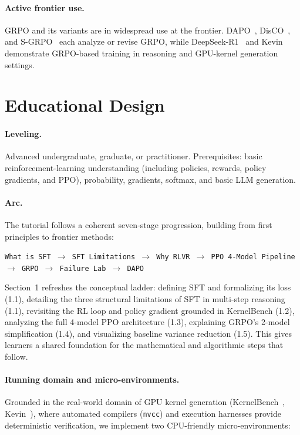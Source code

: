 \documentclass{article}
\begin{document}
\paragraph{Active frontier use.} GRPO and its variants are in widespread use at the frontier. DAPO~\cite{dapo}, DisCO~\cite{disco}, and S-GRPO~\cite{sgrpo} each analyze or revise GRPO, while DeepSeek-R1~\cite{deepseekr1} and Kevin~\cite{kevin} demonstrate GRPO-based training in reasoning and GPU-kernel generation settings.

\section{Educational Design}

\paragraph{Leveling.} Advanced undergraduate, graduate, or practitioner. Prerequisites: basic reinforcement-learning understanding (including policies, rewards, policy gradients, and PPO), probability, gradients, softmax, and basic LLM generation.

\paragraph{Arc.} The tutorial follows a coherent seven-stage progression, building from first principles to frontier methods:
\begin{center}
\texttt{What is SFT $\to$ SFT Limitations $\to$ Why RLVR $\to$ PPO 4-Model Pipeline $\to$ GRPO $\to$ Failure Lab $\to$ DAPO}
\end{center}
Section~1 refreshes the conceptual ladder: defining SFT and formalizing its loss (1.1), detailing the three structural limitations of SFT in multi-step reasoning (1.1), revisiting the RL loop and policy gradient grounded in KernelBench (1.2), analyzing the full 4-model PPO architecture (1.3), explaining GRPO's 2-model simplification (1.4), and visualizing baseline variance reduction (1.5). This gives learners a shared foundation for the mathematical and algorithmic steps that follow.

\paragraph{Running domain and micro-environments.} Grounded in the real-world domain of GPU kernel generation (KernelBench~\cite{kernelbench}, Kevin~\cite{kevin}), where automated compilers (\texttt{nvcc}) and execution harnesses provide deterministic verification, we implement two CPU-friendly micro-environments:
\end{document}
